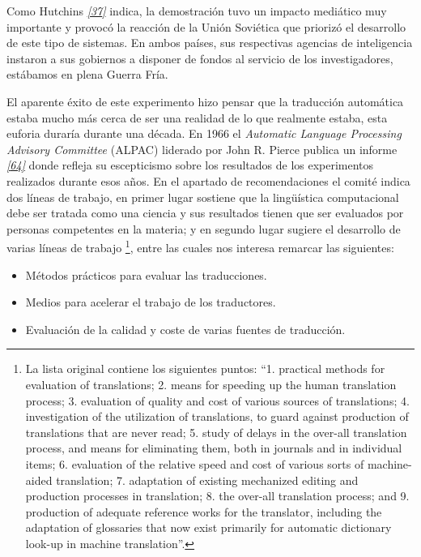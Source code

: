 \documentclass[a4paper,12pt,spanish]{book}
\begin{document}
Como Hutchins \label{0.intro:id14}{\hyperref[zreferences:hutchins1994]{\emph{{[}37{]}}}} indica, la demostración tuvo un impacto
mediático muy importante y provocó la reacción de la Unión Soviética que priorizó el
desarrollo de este tipo de sistemas. En ambos países, sus respectivas agencias de
inteligencia instaron a sus gobiernos a disponer de fondos al servicio de los
investigadores, estábamos en plena Guerra Fría.

El aparente éxito de este experimento hizo pensar que la traducción automática estaba
mucho más cerca de ser una realidad de lo que realmente estaba, esta euforia duraría
durante una década. En 1966 el \emph{Automatic Language Processing Advisory Committee} (ALPAC)
liderado por John R. Pierce publica un informe \label{0.intro:id15}{\hyperref[zreferences:pierce1966]{\emph{{[}64{]}}}} donde refleja su
escepticismo sobre los resultados de los experimentos realizados durante esos años.
En el apartado de recomendaciones el comité indica dos líneas de trabajo, en primer lugar
sostiene que la lingüística computacional debe ser tratada como una ciencia y sus
resultados tienen que ser evaluados por personas competentes en la materia; y en
segundo lugar sugiere el desarrollo de varias líneas de trabajo \footnote{
La lista original contiene los siguientes puntos: ``1. practical methods
for evaluation of translations; 2. means for speeding up the human translation
process; 3. evaluation of quality and cost of various sources of translations;
4. investigation of the utilization of translations, to guard against production
of translations that are never read; 5. study of delays in the over-all
translation process, and means for eliminating them, both in journals and in
individual items; 6. evaluation of the relative speed and cost of various sorts
of machine-aided translation; 7. adaptation of existing mechanized editing and
production processes in translation; 8. the over-all translation process; and
9. production of adequate reference works for the translator, including the
adaptation of glossaries that now exist primarily for automatic dictionary look-up
in machine translation''.
}, entre las
cuales nos interesa remarcar las siguientes:
\begin{itemize}
\item {} 
Métodos prácticos para evaluar las traducciones.

\item {} 
Medios para acelerar el trabajo de los traductores.

\item {} 
Evaluación de la calidad y coste de varias fuentes de traducción.

\end{itemize}
\end{document}
